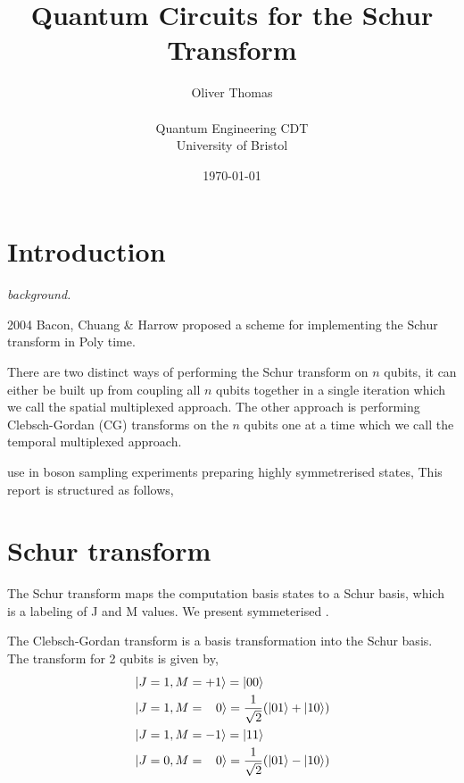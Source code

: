 \documentclass[12pt]{article}
\begin{document}

    \title{Quantum Circuits for the Schur Transform}
    \author{Oliver Thomas \\[0.5em] \\ Quantum Engineering CDT \\ University of Bristol}
    \date{\today}
    \maketitle



\section{Introduction}

\textit{background.}

2004 Bacon, Chuang \& Harrow proposed a scheme for implementing the Schur transform in Poly time. 

There are two distinct ways of performing the Schur transform on $n$ qubits, it can either be built up from coupling all $n$ qubits together in a single iteration which we call the spatial multiplexed approach. The
other approach is performing Clebsch-Gordan (CG) transforms on the $n$ qubits one at a time which we call the temporal multiplexed approach.  

use in boson sampling experiments preparing highly symmetrerised states, \cite{moylett2018quantum}
This report is structured as follows,   

\section{Schur transform}

The Schur transform  maps the computation basis states to a Schur basis, which is a labeling of J and M values.
We present symmeterised  \cite{kirby2017practical}.

The Clebsch-Gordan transform is a basis transformation into the Schur basis. The transform for 2 qubits is given by,
\begin{subequations}
\begin{align}
\begin{split}
&\left\vert{J=1, M=+1}\right\rangle = \left\vert{00}\right\rangle \\
&\left\vert{J=1, M=\;\;\;0}\right\rangle = \frac{1}{\sqrt{2}}(\left\vert{01}\right\rangle + \left\vert{10}\right\rangle) \\
&\left\vert{J=1, M=-1}\right\rangle = \left\vert{11}\right\rangle \\
\end{split}\\
\begin{split}
&\left\vert{J=0, M=\;\;\;0}\right\rangle = \frac{1}{\sqrt{2}}(\left\vert{01}\right\rangle - \left\vert{10}\right\rangle)\\
\end{split}
\end{align}
\end{subequations}
\end{document}

